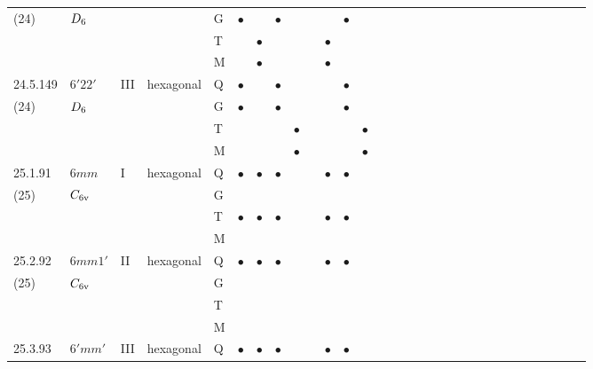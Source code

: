 \documentclass[fleqn,9pt,landscape]{jsarticle}
\begin{document}
\begin{longtable}{lllll|l|l|l|l|l|l|l|l|l|ll|ll|ll|ll|ll|ll|ll|ll}
(24) & $D_{\rm 6}$ &  &  & G & $\bullet$ &  & $\bullet$ &  &  &  & $\bullet$ &  &  &  &  &  &  &  &  &  &  &  &  &  &  &  &  &  &  \\
 &  &  &  & T &  & $\bullet$ &  &  &  & $\bullet$ &  &  &  &  &  &  &  &  &  &  &  &  &  &  &  &  &  &  &  \\
 &  &  &  & M &  & $\bullet$ &  &  &  & $\bullet$ &  &  &  &  &  &  &  &  &  &  &  &  &  &  &  &  &  &  &  \\ \hline
24.5.149 & \texttt{$6'22'$} & III & hexagonal & Q & $\bullet$ &  & $\bullet$ &  &  &  & $\bullet$ &  &  &  &  &  &  &  &  &  &  &  &  &  &  &  &  &  &  \\
(24) & $D_{\rm 6}$ &  &  & G & $\bullet$ &  & $\bullet$ &  &  &  & $\bullet$ &  &  &  &  &  &  &  &  &  &  &  &  &  &  &  &  &  &  \\
 &  &  &  & T &  &  &  & $\bullet$ &  &  &  & $\bullet$ &  &  &  &  &  &  &  &  &  &  &  &  &  &  &  &  &  \\
 &  &  &  & M &  &  &  & $\bullet$ &  &  &  & $\bullet$ &  &  &  &  &  &  &  &  &  &  &  &  &  &  &  &  &  \\ \hline
25.1.91 & \texttt{$6mm$} & I & hexagonal & Q & $\bullet$ & $\bullet$ & $\bullet$ &  &  & $\bullet$ & $\bullet$ &  &  &  &  &  &  &  &  &  &  &  &  &  &  &  &  &  &  \\
(25) & $C_{\rm 6v}$ &  &  & G &  &  &  &  &  &  &  &  &  &  &  &  &  &  &  &  &  &  &  &  &  &  &  &  &  \\
 &  &  &  & T & $\bullet$ & $\bullet$ & $\bullet$ &  &  & $\bullet$ & $\bullet$ &  &  &  &  &  &  &  &  &  &  &  &  &  &  &  &  &  &  \\
 &  &  &  & M &  &  &  &  &  &  &  &  &  &  &  &  &  &  &  &  &  &  &  &  &  &  &  &  &  \\ \hline
25.2.92 & \texttt{$6mm1'$} & II & hexagonal & Q & $\bullet$ & $\bullet$ & $\bullet$ &  &  & $\bullet$ & $\bullet$ &  &  &  &  &  &  &  &  &  &  &  &  &  &  &  &  &  &  \\
(25) & $C_{\rm 6v}$ &  &  & G &  &  &  &  &  &  &  &  &  &  &  &  &  &  &  &  &  &  &  &  &  &  &  &  &  \\
 &  &  &  & T &  &  &  &  &  &  &  &  &  &  &  &  &  &  &  &  &  &  &  &  &  &  &  &  &  \\
 &  &  &  & M &  &  &  &  &  &  &  &  &  &  &  &  &  &  &  &  &  &  &  &  &  &  &  &  &  \\ \hline
25.3.93 & \texttt{$6'mm'$} & III & hexagonal & Q & $\bullet$ & $\bullet$ & $\bullet$ &  &  & $\bullet$ & $\bullet$ &  &  &  &  &  &  &  &  &  &  &  &  &  &  &  &  &  &  \\

\end{longtable}
\end{document}
